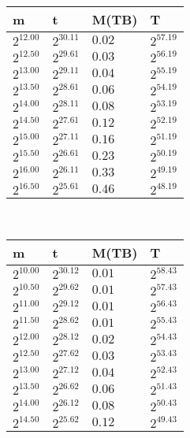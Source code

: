 \begin{tabular}{llll}
m & t & M(TB) & T \\ \hline
$2^{12.00}$ & $2^{30.11}$ & $0.02$ & $2^{57.19}$ \\
$2^{12.50}$ & $2^{29.61}$ & $0.03$ & $2^{56.19}$ \\
$2^{13.00}$ & $2^{29.11}$ & $0.04$ & $2^{55.19}$ \\
$2^{13.50}$ & $2^{28.61}$ & $0.06$ & $2^{54.19}$ \\
$2^{14.00}$ & $2^{28.11}$ & $0.08$ & $2^{53.19}$ \\
$2^{14.50}$ & $2^{27.61}$ & $0.12$ & $2^{52.19}$ \\
$2^{15.00}$ & $2^{27.11}$ & $0.16$ & $2^{51.19}$ \\
$2^{15.50}$ & $2^{26.61}$ & $0.23$ & $2^{50.19}$ \\
$2^{16.00}$ & $2^{26.11}$ & $0.33$ & $2^{49.19}$ \\
$2^{16.50}$ & $2^{25.61}$ & $0.46$ & $2^{48.19}$ \\
\end{tabular}
 \ 
\begin{tabular}{llll}
m & t & M(TB) & T \\ \hline
$2^{10.00}$ & $2^{30.12}$ & $0.01$ & $2^{58.43}$ \\
$2^{10.50}$ & $2^{29.62}$ & $0.01$ & $2^{57.43}$ \\
$2^{11.00}$ & $2^{29.12}$ & $0.01$ & $2^{56.43}$ \\
$2^{11.50}$ & $2^{28.62}$ & $0.01$ & $2^{55.43}$ \\
$2^{12.00}$ & $2^{28.12}$ & $0.02$ & $2^{54.43}$ \\
$2^{12.50}$ & $2^{27.62}$ & $0.03$ & $2^{53.43}$ \\
$2^{13.00}$ & $2^{27.12}$ & $0.04$ & $2^{52.43}$ \\
$2^{13.50}$ & $2^{26.62}$ & $0.06$ & $2^{51.43}$ \\
$2^{14.00}$ & $2^{26.12}$ & $0.08$ & $2^{50.43}$ \\
$2^{14.50}$ & $2^{25.62}$ & $0.12$ & $2^{49.43}$ \\
\end{tabular}
 \ 
